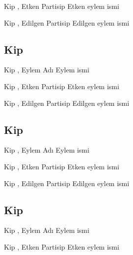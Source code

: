 \begin{kip}{}{Kip , Etken Partisip}
  Etken eylem ismi
\end{kip}

\begin{kip}{}{Kip , Edilgen Partisip}
  Edilgen eylem ismi
\end{kip}

\subsection*{Kip }

\begin{kip}{}{Kip , Eylem Adı}
  Eylem ismi
\end{kip}

\begin{kip}{}{Kip , Etken Partisip}
  Etken eylem ismi
\end{kip}

\begin{kip}{}{Kip , Edilgen Partisip}
  Edilgen eylem ismi
\end{kip}


\subsection*{Kip }

\begin{kip}{}{Kip , Eylem Adı}
  Eylem ismi
\end{kip}

\begin{kip}{}{Kip , Etken Partisip}
  Etken eylem ismi
\end{kip}

\begin{kip}{}{Kip , Edilgen Partisip}
  Edilgen eylem ismi
\end{kip}


\subsection*{Kip }

\begin{kip}{}{Kip , Eylem Adı}
  Eylem ismi
\end{kip}

\begin{kip}{}{Kip , Etken Partisip}
  Etken eylem ismi
\end{kip}

